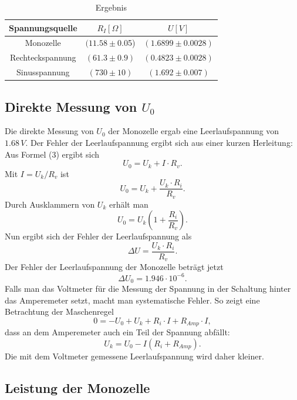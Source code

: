 \documentclass[11pt]{article}
\begin{document}
 \begin{table}[h]
 \centering
 \caption{Ergebnis}
 \begin{tabular}{|c|c|c|}
  \hline
  Spannungsquelle & $R_I[\Omega]$ & $U[V]$ \\
  \hline
  Monozelle & $(11.58\pm$0.05) & $(1.6899\pm0.0028)$ \\
  Rechteckspannung & $(61.3\pm0.9)$& $(0.4823\pm0.0028)$ \\
  Sinusspannung & $(730\pm10)$ & $(1.692\pm0.007)$\\
  \hline
 \end{tabular}
 \label{Ergebnis}
 \end{table}

\subsection{Direkte Messung von $U_0$}
Die direkte Messung von $U_0$ der Monozelle ergab eine Leerlaufspannung von $1.68\, V$. Der Fehler der Leerlaufspannung ergibt sich aus einer kurzen Herleitung:\newline
Aus Formel (3) ergibt sich
\[ U_0 = U_k + I \cdot R_v. \]
Mit $I=U_k / R_v$ ist
\[ U_0 = U_k + \frac{U_k \cdot R_i}{R_v}.\]
Durch Ausklammern von $U_k$ erhält man
\[ U_0 = U_k \left( 1+\frac{R_i}{R_v}\right) .\]
Nun ergibt sich der Fehler der Leerlaufspannung als
\[ \Delta U = \frac{U_k \cdot R_i}{R_v}. \]
Der Fehler der Leerlaufspannung der Monozelle beträgt jetzt
\[ \Delta U_0 = 1.946 \cdot 10^{-6}.\]
\newline
Falls man das Voltmeter für die Messung der Spannung in der Schaltung hinter das Amperemeter setzt, macht man systematische Fehler. So zeigt eine Betrachtung der Maschenregel
\[ 0 = -U_0 + U_k + R_i \cdot I + R_{Amp} \cdot I ,\]
dass an dem Amperemeter auch ein Teil der Spannung abfällt:
\[ U_k = U_0 - I(R_i + R_{Amp}). \]
\newline
Die mit dem Voltmeter gemessene Leerlaufspannung wird daher kleiner.
\subsection{Leistung der Monozelle}
\end{document}

